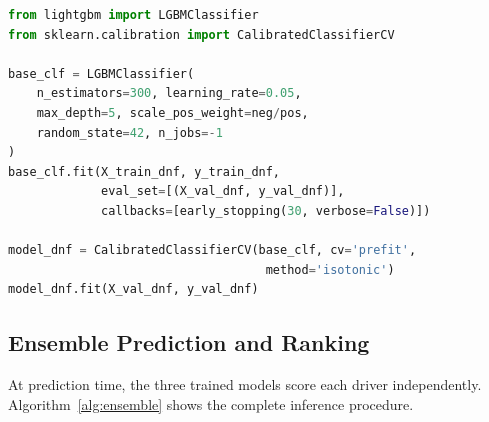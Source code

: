 \documentclass[12pt, a4paper, oneside]{report}
\begin{document}
\begin{lstlisting}[language=Python,
  caption={Calibrated DNF classifier training (simplified).}]
from lightgbm import LGBMClassifier
from sklearn.calibration import CalibratedClassifierCV

base_clf = LGBMClassifier(
    n_estimators=300, learning_rate=0.05,
    max_depth=5, scale_pos_weight=neg/pos,
    random_state=42, n_jobs=-1
)
base_clf.fit(X_train_dnf, y_train_dnf,
             eval_set=[(X_val_dnf, y_val_dnf)],
             callbacks=[early_stopping(30, verbose=False)])

model_dnf = CalibratedClassifierCV(base_clf, cv='prefit',
                                    method='isotonic')
model_dnf.fit(X_val_dnf, y_val_dnf)
\end{lstlisting}

\subsection{Ensemble Prediction and Ranking}
\label{subsec:ensemble-impl}

At prediction time, the three trained models score each driver independently.
Algorithm~\ref{alg:ensemble} shows the complete inference procedure.
\end{document}

